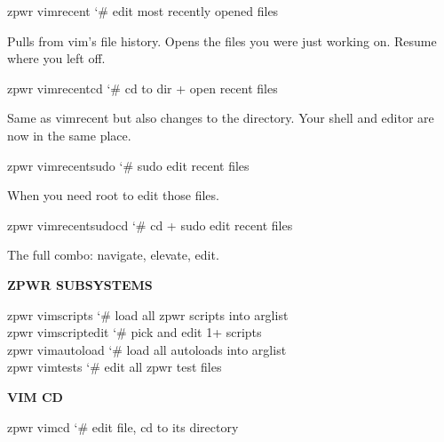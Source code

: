 \documentclass[11pt,a4paper,twoside]{book}
\begin{document}
\begin{codebox}
\color{neongreen}zpwr vimrecent          {\char`\#} edit most recently opened files\\
\end{codebox}

Pulls from vim's file history. Opens the files you were just working on. Resume where you left off.

\begin{codebox}
\color{neongreen}zpwr vimrecentcd        {\char`\#} cd to dir + open recent files\\
\end{codebox}

Same as vimrecent but also changes to the directory. Your shell and editor are now in the same place.

\begin{codebox}
\color{neongreen}zpwr vimrecentsudo      {\char`\#} sudo edit recent files\\
\end{codebox}

When you need root to edit those files.

\begin{codebox}
\color{neongreen}zpwr vimrecentsudocd    {\char`\#} cd + sudo edit recent files\\
\end{codebox}

The full combo: navigate, elevate, edit.


\vspace{12pt}
{\bfseries\color{neonyellow} \textbf{ZPWR} SUBSYSTEMS}\vspace{4pt}

\begin{codebox}
\color{neongreen}zpwr vimscripts         {\char`\#} load all zpwr scripts into arglist\\
\color{neongreen}zpwr vimscriptedit      {\char`\#} pick and edit 1+ scripts\\
\color{neongreen}zpwr vimautoload        {\char`\#} load all autoloads into arglist\\
\color{neongreen}zpwr vimtests           {\char`\#} edit all zpwr test files\\
\end{codebox}


\vspace{12pt}
{\bfseries\color{neonyellow} VIM CD}\vspace{4pt}

\begin{codebox}
\color{neongreen}zpwr vimcd              {\char`\#} edit file, cd to its directory\\
\end{codebox}
\end{document}
